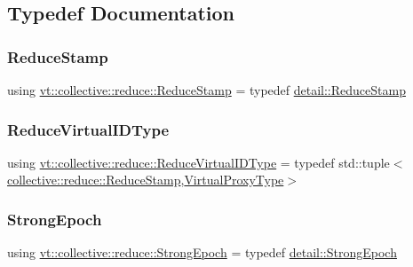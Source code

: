 \subsection{Typedef Documentation}
\mbox{\label{namespacevt_1_1collective_1_1reduce_a7b7cb3021ac5654d92825d9fab0250b2}} 
\subsubsection{\texorpdfstring{Reduce\+Stamp}{ReduceStamp}}
{\footnotesize\ttfamily using \hyperlink{namespacevt_1_1collective_1_1reduce_a7b7cb3021ac5654d92825d9fab0250b2}{vt\+::collective\+::reduce\+::\+Reduce\+Stamp} = typedef \hyperlink{namespacevt_1_1collective_1_1reduce_1_1detail_aacc1fcd729d934ba143fee3a943bf9e7}{detail\+::\+Reduce\+Stamp}}

\mbox{\label{namespacevt_1_1collective_1_1reduce_a6d4ad09f8584c3ec79f46944eb773376}} 
\subsubsection{\texorpdfstring{Reduce\+Virtual\+I\+D\+Type}{ReduceVirtualIDType}}
{\footnotesize\ttfamily using \hyperlink{namespacevt_1_1collective_1_1reduce_a6d4ad09f8584c3ec79f46944eb773376}{vt\+::collective\+::reduce\+::\+Reduce\+Virtual\+I\+D\+Type} = typedef std\+::tuple$<$\hyperlink{namespacevt_1_1collective_1_1reduce_a7b7cb3021ac5654d92825d9fab0250b2}{collective\+::reduce\+::\+Reduce\+Stamp},\hyperlink{namespacevt_a1b417dd5d684f045bb58a0ede70045ac}{Virtual\+Proxy\+Type}$>$}

\mbox{\label{namespacevt_1_1collective_1_1reduce_a0b5fbe1e89aea537d76fda4c57f2099e}} 
\subsubsection{\texorpdfstring{Strong\+Epoch}{StrongEpoch}}
{\footnotesize\ttfamily using \hyperlink{namespacevt_1_1collective_1_1reduce_a0b5fbe1e89aea537d76fda4c57f2099e}{vt\+::collective\+::reduce\+::\+Strong\+Epoch} = typedef \hyperlink{namespacevt_1_1collective_1_1reduce_1_1detail_a9e57fa5e7a2557a92ce0739edae200fe}{detail\+::\+Strong\+Epoch}}

